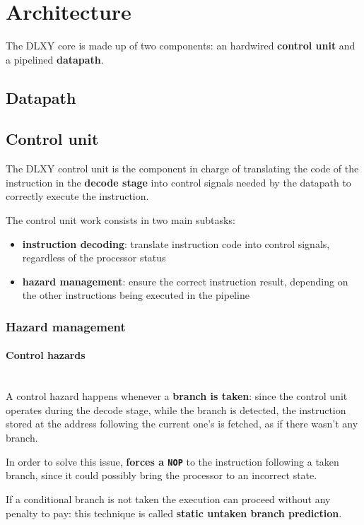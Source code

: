 \section{Architecture}
The DLXY core is made up of two components: an hardwired \textbf{control unit}
and a pipelined \textbf{datapath}.

\subsection{Datapath}

\subsection{Control unit}
The DLXY control unit is the component in charge of translating the code
of the instruction in the \textbf{decode stage} into control signals
needed by the datapath to correctly execute the instruction.

\bigskip
The control unit work consists in two main subtasks:
\begin{itemize}
	\item \textbf{instruction decoding}: translate instruction code into
		control signals, regardless of the processor status
	\item \textbf{hazard management}: ensure the correct instruction result,
		depending on the other instructions being executed in the pipeline
\end{itemize}

\subsubsection{Hazard management}

\paragraph{Control hazards} \mbox{} \\
A control hazard happens whenever a \textbf{branch is taken}: since the control
unit operates during the decode stage, while the branch is detected, the 
instruction stored at the address following the current one's is fetched, as if
there wasn't any branch.

In order to solve this issue, \textbf{forces a \texttt{NOP}} to the instruction
following a taken branch, since it could possibly bring the processor to an
incorrect state.

\bigskip
If a conditional branch is not taken the execution can proceed without any
penalty to pay: this technique is called \textbf{static untaken branch prediction}.

